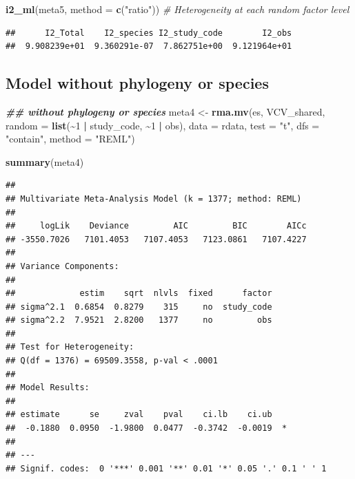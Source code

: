 \documentclass[
]{article}
\newenvironment{Shaded}{\begin{snugshade}}{\end{snugshade}}
\newcommand{\AttributeTok}[1]{\textcolor[rgb]{0.13,0.29,0.53}{#1}}
\newcommand{\CommentTok}[1]{\textcolor[rgb]{0.56,0.35,0.01}{\textit{#1}}}
\newcommand{\DecValTok}[1]{\textcolor[rgb]{0.00,0.00,0.81}{#1}}
\newcommand{\DocumentationTok}[1]{\textcolor[rgb]{0.56,0.35,0.01}{\textbf{\textit{#1}}}}
\newcommand{\FunctionTok}[1]{\textcolor[rgb]{0.13,0.29,0.53}{\textbf{#1}}}
\newcommand{\NormalTok}[1]{#1}
\newcommand{\OtherTok}[1]{\textcolor[rgb]{0.56,0.35,0.01}{#1}}
\newcommand{\SpecialCharTok}[1]{\textcolor[rgb]{0.81,0.36,0.00}{\textbf{#1}}}
\newcommand{\StringTok}[1]{\textcolor[rgb]{0.31,0.60,0.02}{#1}}
\begin{document}
\begin{Shaded}
\begin{Highlighting}[]
\FunctionTok{i2\_ml}\NormalTok{(meta5, }\AttributeTok{method =} \FunctionTok{c}\NormalTok{(}\StringTok{"ratio"}\NormalTok{))  }\CommentTok{\# Heterogeneity at each random factor level}
\end{Highlighting}
\end{Shaded}

\begin{verbatim}
##      I2_Total    I2_species I2_study_code        I2_obs 
##  9.908239e+01  9.360291e-07  7.862751e+00  9.121964e+01
\end{verbatim}

\newpage

\hypertarget{model-without-phylogeny-or-species}{%
\subsection{Model without phylogeny or
species}\label{model-without-phylogeny-or-species}}

\begin{Shaded}
\begin{Highlighting}[]
\DocumentationTok{\#\# without phylogeny or species}
\NormalTok{meta4 }\OtherTok{\textless{}{-}} \FunctionTok{rma.mv}\NormalTok{(es, VCV\_shared, }\AttributeTok{random =} \FunctionTok{list}\NormalTok{(}\SpecialCharTok{\textasciitilde{}}\DecValTok{1} \SpecialCharTok{|}\NormalTok{ study\_code,}
    \SpecialCharTok{\textasciitilde{}}\DecValTok{1} \SpecialCharTok{|}\NormalTok{ obs), }\AttributeTok{data =}\NormalTok{ rdata, }\AttributeTok{test =} \StringTok{"t"}\NormalTok{, }\AttributeTok{dfs =} \StringTok{"contain"}\NormalTok{, }\AttributeTok{method =} \StringTok{"REML"}\NormalTok{)}
\end{Highlighting}
\end{Shaded}

\begin{Shaded}
\begin{Highlighting}[]
\FunctionTok{summary}\NormalTok{(meta4)}
\end{Highlighting}
\end{Shaded}

\begin{verbatim}
## 
## Multivariate Meta-Analysis Model (k = 1377; method: REML)
## 
##     logLik    Deviance         AIC         BIC        AICc   
## -3550.7026   7101.4053   7107.4053   7123.0861   7107.4227   
## 
## Variance Components:
## 
##             estim    sqrt  nlvls  fixed      factor 
## sigma^2.1  0.6854  0.8279    315     no  study_code 
## sigma^2.2  7.9521  2.8200   1377     no         obs 
## 
## Test for Heterogeneity:
## Q(df = 1376) = 69509.3558, p-val < .0001
## 
## Model Results:
## 
## estimate      se     zval    pval    ci.lb    ci.ub    
##  -0.1880  0.0950  -1.9800  0.0477  -0.3742  -0.0019  * 
## 
## ---
## Signif. codes:  0 '***' 0.001 '**' 0.01 '*' 0.05 '.' 0.1 ' ' 1
\end{verbatim}
\end{document}
